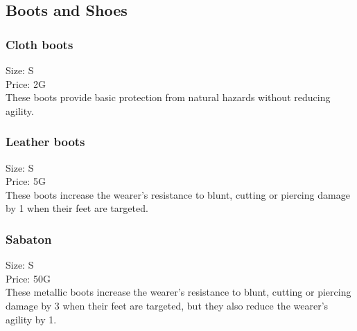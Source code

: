 \subsection{Boots and Shoes}

\subsubsection{Cloth boots}
Size: S\\
Price: 2G\\
These boots provide basic protection from natural hazards without reducing agility.

\subsubsection{Leather boots}
Size: S\\
Price: 5G\\
These boots increase the wearer's resistance to blunt, cutting or piercing damage by 1 when their feet are targeted.

\subsubsection{Sabaton}
Size: S\\
Price: 50G\\
These metallic boots increase the wearer's resistance to blunt, cutting or piercing damage by 3 when their feet are targeted, but they also reduce the wearer's agility by 1.